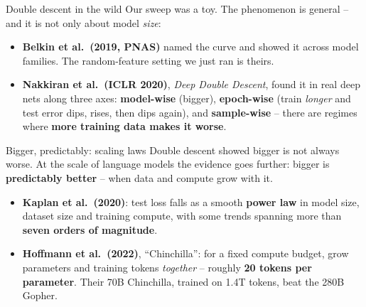 \documentclass[aspectratio=43]{beamer}
\begin{document}
\begin{frame}{Double descent in the wild}
  Our sweep was a toy. The phenomenon is general -- and it is not only about model \emph{size}:
  \vskip 3pt
  \begin{itemize}\small
    \item \textbf{Belkin et al.\ (2019, PNAS)} named the curve and showed it across model
      families. The random-feature setting we just ran is theirs.
    \item \textbf{Nakkiran et al.\ (ICLR 2020)}, \emph{Deep Double Descent}, found it in real
      deep nets along three axes: \textbf{model-wise} (bigger), \textbf{epoch-wise} (train
      \emph{longer} and test error dips, rises, then dips again), and \textbf{sample-wise} --
      there are regimes where \textbf{more training data makes it worse}.
  \end{itemize}
  \vskip 3pt
\end{frame}

\begin{frame}{Bigger, predictably: scaling laws}
  \small
  Double descent showed bigger is not always worse. At the scale of language models the
  evidence goes further: bigger is \textbf{predictably better} -- when data and compute grow
  with it.
  \vskip 3pt
  \begin{itemize}\small
    \item \textbf{Kaplan et al.\ (2020)}: test loss falls as a smooth \textbf{power law} in model
      size, dataset size and training compute, with some trends spanning more than
      \textbf{seven orders of magnitude}.
    \item \textbf{Hoffmann et al.\ (2022)}, ``Chinchilla'': for a fixed compute budget, grow
      parameters and training tokens \emph{together} -- roughly \textbf{20 tokens per
      parameter}. Their 70B Chinchilla, trained on 1.4T tokens, beat the 280B Gopher.
  \end{itemize}
  \vskip 3pt
\end{frame}
\end{document}
